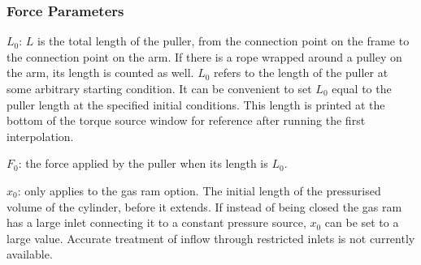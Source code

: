 \documentclass{article}
\begin{document}
\subsubsection{Force Parameters}
\begin{description}
\item $L_0$: $L$ is the total length of the puller, from the connection point on the frame to the connection point on the arm. If there is a rope wrapped around a pulley on the arm, its length is counted as well. $L_0$ refers to the length of the puller at some arbitrary starting condition. It can be convenient to set $L_0$ equal to the puller length at the specified initial conditions. This length is printed at the bottom of the torque source window for reference after running the first interpolation.
\item $F_0$: the force applied by the puller when its length is $L_0$.
\item $x_0$: only applies to the gas ram option. The initial length of the pressurised volume of the cylinder, before it extends. If instead of being closed the gas ram has a large inlet connecting it to a constant pressure source, $x_0$ can be set to a large value. Accurate treatment of inflow through restricted inlets is not currently available.
\end{description}
\end{document}
